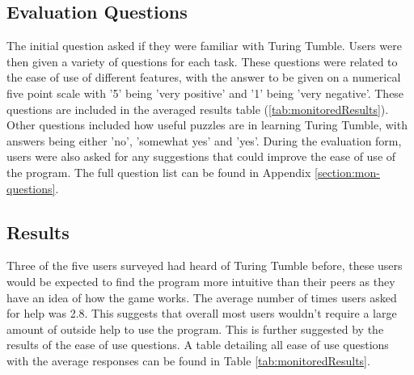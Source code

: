 \documentclass{l4proj}
\begin{document}
\subsection{Evaluation Questions}
\label{section:monitored-questions}
The initial question asked if they were familiar with Turing Tumble. Users were then given a variety of questions for each task. These questions were related to the ease of use of different features, with the answer to be given on a numerical five point scale with '5' being 'very positive' and '1' being 'very negative'. These questions are included in the averaged results table (\ref{tab:monitoredResults}). Other questions included how useful puzzles are in learning Turing Tumble, with answers being either 'no', 'somewhat yes' and 'yes'. During the evaluation form, users were also asked for any suggestions that could improve the ease of use of the program. The full question list can be found in Appendix \ref{section:mon-questions}.


\subsection{Results}
Three of the five users surveyed had heard of Turing Tumble before, these users would be expected to find the program more intuitive than their peers as they have an idea of how the game works. The average number of times users asked for help was 2.8. This suggests that overall most users wouldn't require a large amount of outside help to use the program. This is further suggested by the results of the ease of use questions. A table detailing all ease of use questions with the average responses can be found in Table \ref{tab:monitoredResults}.
\end{document}
